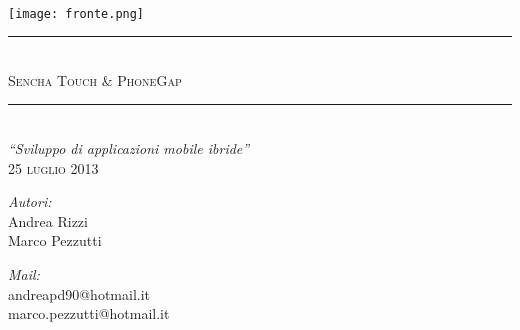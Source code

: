 \documentclass[10pt,a4paper,onecolumn]{article}
\begin{document}
\begin{titlepage}

\begin{center}
 
\textsc{\Large}\\[6cm]

\texttt{[image: fronte.png]}\\[0.3cm]  
\noindent\rule{\textwidth}{0.4pt} \\[0.3cm]
\textsc{\Large Sencha Touch \& PhoneGap}\\[0.1cm]
\noindent\rule{\textwidth}{0.4pt}\\[0.5cm]
\textit{``Sviluppo di applicazioni mobile ibride''} \\[0.5cm]
\textsc{25 luglio 2013}\\[0.5cm]
\begin{minipage}{0.4\textwidth}
\begin{flushleft} \large
\emph{Autori:}\\
Andrea Rizzi\\
Marco Pezzutti
\end{flushleft}
\end{minipage}
\begin{minipage}{0.4\textwidth}
\begin{flushright} \large
\emph{Mail:} \\
andreapd90@hotmail.it\\
marco.pezzutti@hotmail.it
\end{flushright}
\end{minipage}
\end{center}
\end{titlepage}

\clearpage
{}
\tableofcontents

\clearpage
{}
\listoffigures

\clearpage
{}
\lstlistoflistings 
\end{document}
